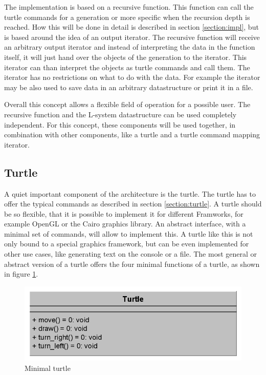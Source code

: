 \documentclass[english]{cpp-hmwk}
\begin{document}
The implementation is based on a recursive function. This function can call the turtle commands for a generation or more specific when the recursion depth is reached. How this will be done in detail is described in section \ref{section:impl}, but is based around the idea of an output iterator. The recursive function will receive an arbitrary output iterator and instead of interpreting the data in the function itself, it will just hand over the objects of the generation to the iterator. This iterator can than interpret the objects as turtle commands and call them. The iterator has no restrictions on what to do with the data. For example the iterator may be also used to save data in an arbitrary datastructure or print it in a file.

Overall this concept allows a flexible field of operation for a possible user. The recursive function and the L-system datastructure can be used completely independent. For this concept, these components will be used together, in combination with other components, like a turtle and a turtle command mapping iterator.

\subsection{Turtle}
A quiet important component of the architecture is the turtle. The turtle has to offer the typical commands as described in section \ref{section:turtle}. A turtle should be so flexible, that it is possible to implement it for different Framworks, for example OpenGL or the Cairo graphics library. An abstract interface, with a minimal set of commands, will allow to implement this. A turtle like this is not only bound to a special graphics framework, but can be even implemented for other use cases, like generating text on the console or a file.
The most general or abstract version of a turtle offers the four minimal functions of a turtle, as shown in figure \ref{figure:minimal_turtle}.

\begin{figure}[h!]
	\centering
	\includegraphics[width=0.6\columnwidth]{../graphs/LSystem/examples/class_simple_turtle.png}
	\caption{Minimal turtle}
	\label{figure:minimal_turtle}
\end{figure}
\end{document}
